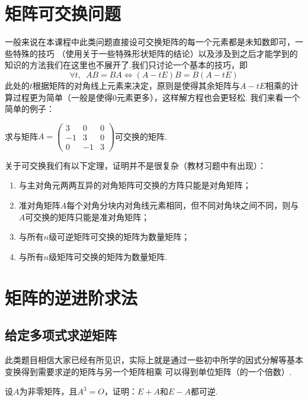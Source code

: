 \section{矩阵可交换问题}
一般来说在本课程中此类问题直接设可交换矩阵的每一个元素都是未知数即可，一些特殊的技巧
（使用关于一些特殊形状矩阵的结论）以及涉及到之后才能学到的知识的方法我们在这里也不展开了.我们只讨论一个基本的技巧，即
\[\forall t,\enspace AB=BA \iff (A-tE)B=B(A-tE)\]
此处的$t$根据矩阵的对角线上元素来决定，原则是使得其余矩阵与$A-tE$相乘的计算过程更为简单（一般是使得0元素更多），这样解方程也会更轻松.
我们来看一个简单的例子：
\begin{example}
    求与矩阵$A=\begin{pmatrix}
        3 & 0 & 0 \\ -1 & 3 & 0 \\ 0 & -1 & 3
    \end{pmatrix}$可交换的矩阵.
\end{example}

关于可交换我们有以下定理，证明并不是很复杂（教材习题中有出现）：
\begin{theorem}
    \begin{enumerate}
        \item 与主对角元两两互异的对角矩阵可交换的方阵只能是对角矩阵；

        \item 准对角矩阵$A$每个对角分块内对角线元素相同，但不同对角块之间不同，则与$A$可交换的矩阵只能是准对角矩阵；

        \item 与所有$n$级可逆矩阵可交换的矩阵为数量矩阵；

        \item 与所有$n$级矩阵可交换的矩阵为数量矩阵.
    \end{enumerate}
\end{theorem}

\section{矩阵的逆进阶求法}
\subsection{给定多项式求逆矩阵}
此类题目相信大家已经有所见识，实际上就是通过一些初中所学的因式分解等基本变换得到需要求逆的矩阵与另一个矩阵相乘
可以得到单位矩阵（的一个倍数）.
\begin{example}
    设$A$为非零矩阵，且$A^3=O$，证明：$E+A$和$E-A$都可逆.
\end{example}

